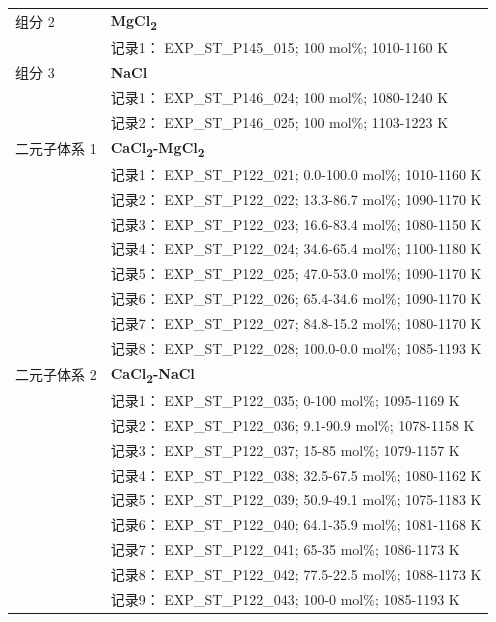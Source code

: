 \documentclass[12pt]{article}
\begin{document}
{\begin{longtable}[]{@{}
  >{\raggedright\arraybackslash}p{}
  >{\raggedright\arraybackslash}p{}@{}}
组分 2  & \textbf{MgCl\textsubscript{2}} \\
 & 记录1： EXP\_ST\_P145\_015; 100 mol\%; 1010-1160 K  \\

组分 3  & \textbf{NaCl} \\
 & 记录1： EXP\_ST\_P146\_024; 100 mol\%; 1080-1240 K \\
 & 记录2： EXP\_ST\_P146\_025; 100 mol\%; 1103-1223 K  \\

二元子体系 1  & \textbf{CaCl\textsubscript{2}-MgCl\textsubscript{2}} \\
 & 记录1： EXP\_ST\_P122\_021; 0.0-100.0 mol\%; 1010-1160 K \\
 & 记录2： EXP\_ST\_P122\_022; 13.3-86.7 mol\%; 1090-1170 K \\
 & 记录3： EXP\_ST\_P122\_023; 16.6-83.4 mol\%; 1080-1150 K \\
 & 记录4： EXP\_ST\_P122\_024; 34.6-65.4 mol\%; 1100-1180 K \\
 & 记录5： EXP\_ST\_P122\_025; 47.0-53.0 mol\%; 1090-1170 K \\
 & 记录6： EXP\_ST\_P122\_026; 65.4-34.6 mol\%; 1090-1170 K \\
 & 记录7： EXP\_ST\_P122\_027; 84.8-15.2 mol\%; 1080-1170 K \\
 & 记录8： EXP\_ST\_P122\_028; 100.0-0.0 mol\%; 1085-1193 K  \\

二元子体系 2  & \textbf{CaCl\textsubscript{2}-NaCl} \\
 & 记录1： EXP\_ST\_P122\_035; 0-100 mol\%; 1095-1169 K \\
 & 记录2： EXP\_ST\_P122\_036; 9.1-90.9 mol\%; 1078-1158 K \\
 & 记录3： EXP\_ST\_P122\_037; 15-85 mol\%; 1079-1157 K \\
 & 记录4： EXP\_ST\_P122\_038; 32.5-67.5 mol\%; 1080-1162 K \\
 & 记录5： EXP\_ST\_P122\_039; 50.9-49.1 mol\%; 1075-1183 K \\
 & 记录6： EXP\_ST\_P122\_040; 64.1-35.9 mol\%; 1081-1168 K \\
 & 记录7： EXP\_ST\_P122\_041; 65-35 mol\%; 1086-1173 K \\
 & 记录8： EXP\_ST\_P122\_042; 77.5-22.5 mol\%; 1088-1173 K \\
 & 记录9： EXP\_ST\_P122\_043; 100-0 mol\%; 1085-1193 K  \\


\end{longtable}}
\end{document}
